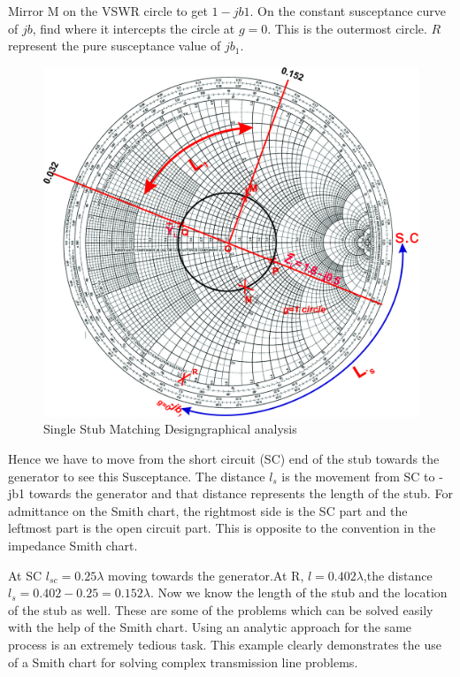 \begin{exmp}
Mirror M on the VSWR circle to get $1-jb1$. On the constant susceptance curve of $jb$, find where it intercepts the circle at $g=0$. This is the outermost circle. $R$ represent the pure susceptance value of $jb_1$. 
\begin{figure}[h]
\centering
\includegraphics[width=1\linewidth]{./graphics/fig14}
\caption{Single Stub Matching Design\textemdash\;graphical analysis}
\label{fig:fig14}
\end{figure}

Hence we have to move from the short circuit (SC) end of the stub towards the generator to see this Susceptance. The distance $l_s$ is the movement from SC to -jb1 towards the generator and that distance represents the length of the stub. For admittance on the Smith chart, the rightmost side is the SC part and the leftmost part is the open circuit part. This is opposite to the convention in the impedance Smith chart.

At SC $l_{sc}=0.25\lambda$ moving towards the generator.At R, $l=0.402\lambda$,the distance $l_s=0.402-0.25=0.152\lambda$. Now we know the length of the stub and the location of the stub as well. These are some of the problems which can be solved easily with the help of the Smith chart. Using an analytic approach for the same process is an extremely tedious task. This example clearly demonstrates the use of a Smith chart for solving complex transmission line problems.
\end{exmp}

